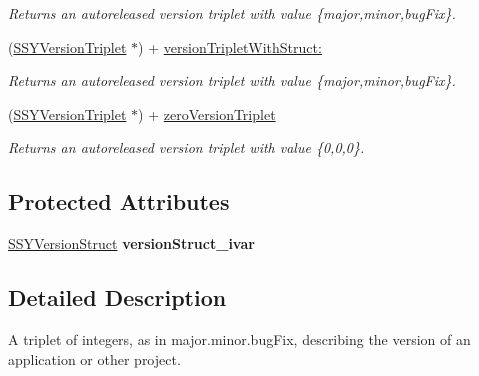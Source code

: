\begin{CompactItemize}
\begin{CompactList}\small\item\em Returns an autoreleased version triplet with value \{major,minor,bugFix\}. \item\end{CompactList}\item 
\hypertarget{interface_s_s_y_version_triplet_e4d76ca42ea979b83993eec5f9d219cb}{
(\hyperlink{interface_s_s_y_version_triplet}{SSYVersionTriplet} $\ast$) + \hyperlink{interface_s_s_y_version_triplet_e4d76ca42ea979b83993eec5f9d219cb}{versionTripletWithStruct:}}
\label{interface_s_s_y_version_triplet_e4d76ca42ea979b83993eec5f9d219cb}

\begin{CompactList}\small\item\em Returns an autoreleased version triplet with value \{major,minor,bugFix\}. \item\end{CompactList}\item 
\hypertarget{interface_s_s_y_version_triplet_914dceef5e772b5a10afdb0636491a6a}{
(\hyperlink{interface_s_s_y_version_triplet}{SSYVersionTriplet} $\ast$) + \hyperlink{interface_s_s_y_version_triplet_914dceef5e772b5a10afdb0636491a6a}{zeroVersionTriplet}}
\label{interface_s_s_y_version_triplet_914dceef5e772b5a10afdb0636491a6a}

\begin{CompactList}\small\item\em Returns an autoreleased version triplet with value \{0,0,0\}. \item\end{CompactList}\end{CompactItemize}
\subsection*{Protected Attributes}
\begin{CompactItemize}
\item 
\hypertarget{interface_s_s_y_version_triplet_841b83f82d7182a63f076028a7451a75}{
\hyperlink{struct_s_s_y_version_struct__struct}{SSYVersionStruct} \textbf{versionStruct\_\-ivar}}
\label{interface_s_s_y_version_triplet_841b83f82d7182a63f076028a7451a75}

\end{CompactItemize}


\subsection{Detailed Description}
A triplet of integers, as in major.minor.bugFix, describing the version of an application or other project. 

